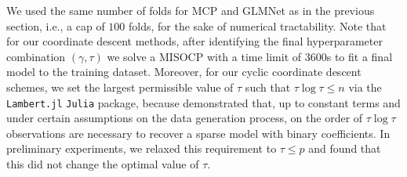 \documentclass[mnsc,nonblindrev]{informs3} %
\begin{document}
We used the same number of folds for MCP and GLMNet as in the previous section, i.e., a cap of $100$ folds, for the sake of numerical tractability. Note that for our coordinate descent methods, after identifying the final hyperparameter combination $(\gamma, \tau)$ we solve a MISOCP with a time limit of $3600$s to fit a final model to the training dataset. Moreover, for our cyclic coordinate descent schemes, we set the largest permissible value of $\tau$ such that $\tau \log \tau \leq n$ via the \verb|Lambert.jl| \verb|Julia| package, because \citet[Theorem 2.5]{gamarnik2022sparse} demonstrated that, up to constant terms and under certain assumptions on the data generation process, on the order of $\tau \log \tau$ observations are necessary to recover a sparse model with binary coefficients. In preliminary experiments, we relaxed this requirement to $\tau \leq p$ and found that this did not change the optimal value of $\tau$.%
\end{document}
